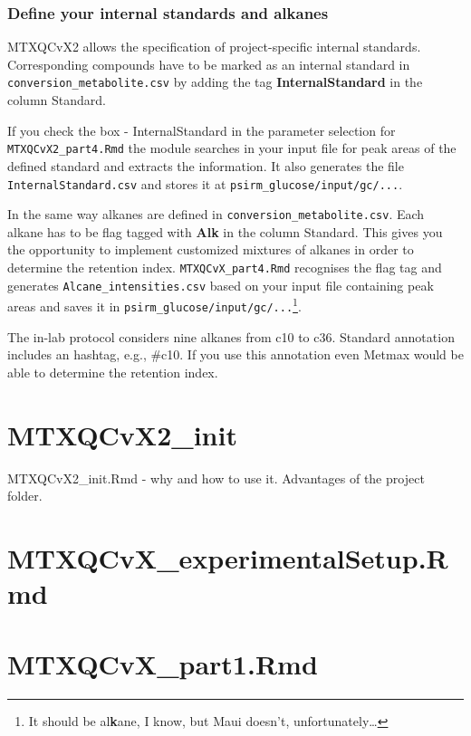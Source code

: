 \documentclass[]{book}
\let\rmarkdownfootnote\footnote%
\def\footnote{\protect\rmarkdownfootnote}
\theoremstyle{definition}
\theoremstyle{definition}
\theoremstyle{definition}
\theoremstyle{remark}
\begin{document}
\subsection{Define your internal standards and
alkanes}\label{define-your-internal-standards-and-alkanes}

MTXQCvX2 allows the specification of project-specific internal
standards. Corresponding compounds have to be marked as an internal
standard in \texttt{conversion\_metabolite.csv} by adding the tag
\textbf{InternalStandard} in the column Standard.

If you check the box - InternalStandard in the parameter selection for
\texttt{MTXQCvX2\_part4.Rmd} the module searches in your input file for
peak areas of the defined standard and extracts the information. It also
generates the file \texttt{InternalStandard.csv} and stores it at
\texttt{psirm\_glucose/input/gc/...}.

In the same way alkanes are defined in
\texttt{conversion\_metabolite.csv}. Each alkane has to be flag tagged
with \textbf{Alk} in the column Standard. This gives you the opportunity
to implement customized mixtures of alkanes in order to determine the
retention index. \texttt{MTXQCvX\_part4.Rmd} recognises the flag tag and
generates \texttt{Alcane\_intensities.csv} based on your input file
containing peak areas and saves it in
\texttt{psirm\_glucose/input/gc/...}\footnote{It should be
  al\textbf{k}ane, I know, but Maui doesn't, unfortunately\ldots{}}.

The in-lab protocol considers nine alkanes from c10 to c36. Standard
annotation includes an hashtag, e.g., \#c10. If you use this annotation
even Metmax would be able to determine the retention index.

\chapter{MTXQCvX2\_init}\label{init}

MTXQCvX2\_init.Rmd - why and how to use it. Advantages of the project
folder.

\chapter{MTXQCvX\_experimentalSetup.Rmd}\label{ExpSetup}

\chapter{MTXQCvX\_part1.Rmd}\label{part1}
\end{document}
